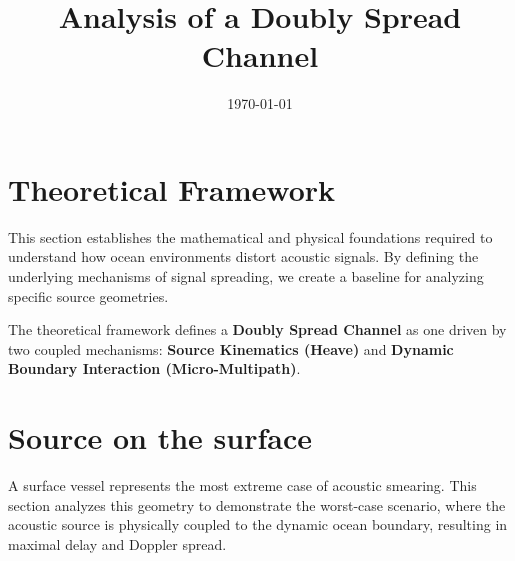 \documentclass{article}
\begin{document}
\title{Analysis of a Doubly Spread Channel}
\author{}
\date{\today}

\maketitle

\section{Theoretical Framework}
This section establishes the mathematical and physical foundations required to understand how ocean environments distort acoustic signals. By defining the underlying mechanisms of signal spreading, we create a baseline for analyzing specific source geometries.

The theoretical framework defines a \textbf{Doubly Spread Channel} \cite{stojanovic1996recent, preisig2007acoustic} as one driven by two coupled mechanisms: \textbf{Source Kinematics (Heave)} and \textbf{Dynamic Boundary Interaction (Micro-Multipath)}.

\section{Source on the surface}
A surface vessel represents the most extreme case of acoustic smearing. This section analyzes this geometry to demonstrate the worst-case scenario, where the acoustic source is physically coupled to the dynamic ocean boundary, resulting in maximal delay and Doppler spread.
\end{document}
